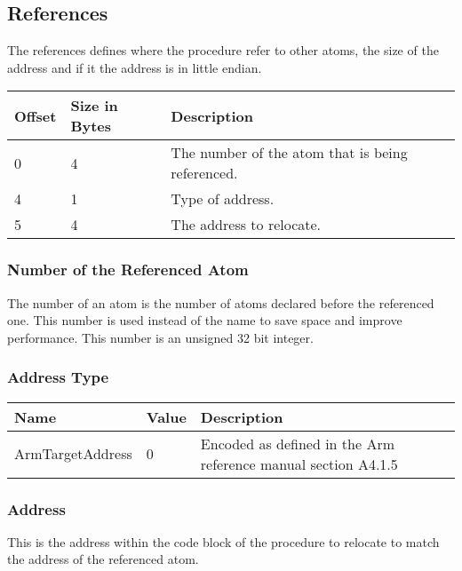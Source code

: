 \subsection{References}
The references defines where the procedure refer to other atoms, the size of the 
address and if it the address is in little endian.

\begin{table}[h]
    \centering
    \label{tbl:reference}
    \begin{tabular}{|l|l|l|}
        \hline
        \textbf{Offset} & \textbf{Size in Bytes} & \textbf{Description}                             \\ \hline
        0               & 4                      & The number of the atom that is being referenced. \\ \hline
        4               & 1                      & Type of address.                                 \\ \hline
        5               & 4                      & The address to relocate.                         \\ \hline
    \end{tabular}
\end{table}

\subsubsection{Number of the Referenced Atom}
The number of an atom is the number of atoms declared before the referenced one.
This number is used instead of the name to save space and improve performance. 
This number is an unsigned 32 bit integer.

\subsubsection{Address Type}
\begin{table}[h]
    \centering
    \begin{tabular}{|l|l|l|}
        \hline
        \textbf{Name}    & \textbf{Value} & \textbf{Description}                                          \\ \hline
        ArmTargetAddress & 0              & Encoded as defined in the Arm reference manual section A4.1.5 \\ \hline
    \end{tabular}
\end{table}

\subsubsection{Address}
This is the address within the code block of the procedure to relocate to match
the address of the referenced atom.